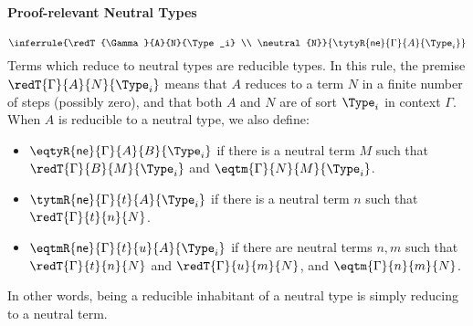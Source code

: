 \paragraph{Proof-relevant Neutral Types}

\[
  \inferrule{\redT{\Gamma}{A}{N}{\Type_i} \\ \neutral{N}}
  {\tytyR{\mathsf{ne}}{\Gamma}{A}{\Type_i}}
\]
Terms which reduce to neutral types are reducible types.
In this rule, the premise \( \redT{\Gamma}{A}{N}{\Type_i} \) means that \( A \) 
reduces to a term \( N \) in a finite number of steps (possibly zero), and that 
both \( A \) and \( N \) are of sort \( \Type_i \) in context \( \Gamma \).
%
When $A$ is reducible to a neutral type, we also define:
\begin{itemize}
  \item \( \eqtyR{\mathsf{ne}}{\Gamma}{A}{B}{\Type_i} \) if there is a neutral term \( M \) such that
    \( \redT{\Gamma}{B}{M}{\Type_i} \) and \( \eqtm{\Gamma}{N}{M}{\Type_i} \).
  \item \( \tytmR{\mathsf{ne}}{\Gamma}{t}{A}{\Type_i} \) if there is a neutral term \( n \) such that
    \( \redT{\Gamma}{t}{n}{N} \).
  \item \( \eqtmR{\mathsf{ne}}{\Gamma}{t}{u}{A}{\Type_i} \) if there are neutral terms \( n, m \) such that
    \( \redT{\Gamma}{t}{n}{N} \) and \( \redT{\Gamma}{u}{m}{N} \), and
    \( \eqtm{\Gamma}{n}{m}{N} \).
\end{itemize}

In other words, being a reducible inhabitant of a neutral type is simply
reducing to a neutral term.

